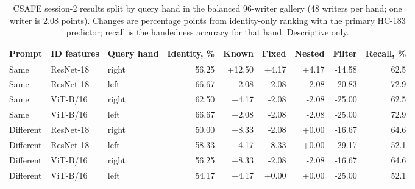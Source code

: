 \begin{table}[ht]
\caption{CSAFE session-2 results split by query hand in the balanced 96-writer gallery (48 writers per hand; one writer is 2.08 points). Changes are percentage points from identity-only ranking with the primary HC-183 predictor; recall is the handedness accuracy for that hand. Descriptive only.}\label{tab:csafebyhand}
\centering\footnotesize\setlength{\tabcolsep}{4pt}
\begin{tabular}{lllrrrrrr}\toprule
Prompt & ID features & Query hand & Identity, \% & Known & Fixed & Nested & Filter & Recall, \%\\\midrule
Same & ResNet-18 & right & 56.25 & +12.50 & +4.17 & +4.17 & -14.58 & 62.5 \\
Same & ResNet-18 & left & 66.67 & +2.08 & -2.08 & -2.08 & -20.83 & 72.9 \\
Same & ViT-B/16 & right & 62.50 & +4.17 & -2.08 & -2.08 & -25.00 & 62.5 \\
Same & ViT-B/16 & left & 66.67 & +2.08 & -2.08 & -2.08 & -25.00 & 72.9 \\
Different & ResNet-18 & right & 50.00 & +8.33 & -2.08 & +0.00 & -16.67 & 64.6 \\
Different & ResNet-18 & left & 58.33 & +4.17 & -8.33 & +0.00 & -29.17 & 52.1 \\
Different & ViT-B/16 & right & 56.25 & +8.33 & -2.08 & -2.08 & -16.67 & 64.6 \\
Different & ViT-B/16 & left & 54.17 & +4.17 & +0.00 & +0.00 & -25.00 & 52.1 \\
\bottomrule
\end{tabular}
\end{table}
